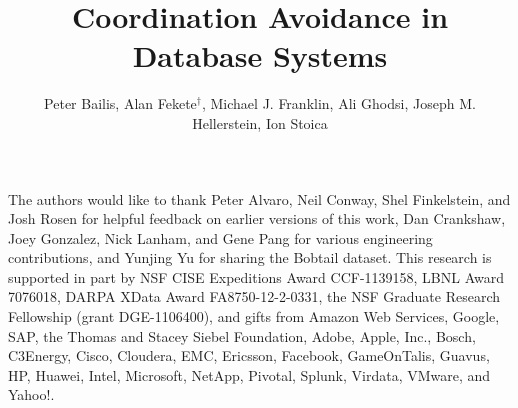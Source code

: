 \documentclass{vldb}
\theoremstyle{definition}
\theoremstyle{remark}
\newcommand{\minihead}[1]{{\vspace{.45em}\noindent\textbf{#1.} }}
\newif\ifextended
\begin{document}
%

\title{Coordination Avoidance in Database Systems\ifextended\\(Extended Version)\fi}

{\author{Peter Bailis, Alan Fekete{\fontsize{12}{14}$^\dagger$},
    Michael J. Franklin, Ali Ghodsi, Joseph M. Hellerstein, Ion Stoica
    \\{}}}
\maketitle


















\ifextended

\fi



{ \iftrue {} The authors would like to thank
  Peter Alvaro, Neil Conway, Shel Finkelstein, and Josh Rosen for
  helpful feedback on earlier versions of this work, Dan Crankshaw,
  Joey Gonzalez, Nick Lanham, and Gene Pang for various engineering
  contributions, and Yunjing Yu for sharing the Bobtail dataset. This
  research is supported in part by NSF CISE Expeditions Award
  CCF-1139158, LBNL Award 7076018, DARPA XData Award
  FA8750-12-2-0331, the NSF Graduate Research Fellowship (grant
  DGE-1106400), and gifts from Amazon Web Services, Google, SAP, the
  Thomas and Stacey Siebel Foundation, Adobe, Apple, Inc., Bosch,
  C3Energy, Cisco, Cloudera, EMC, Ericsson, Facebook, GameOnTalis,
  Guavus, HP, Huawei, Intel, Microsoft, NetApp, Pivotal, Splunk,
  Virdata, VMware, and Yahoo!. \fi \fi}


\scriptsize
\linespread{.98}
\selectfont


 

\balance


\linespread{1}
\selectfont

\ifextended

\fi
\end{document}
